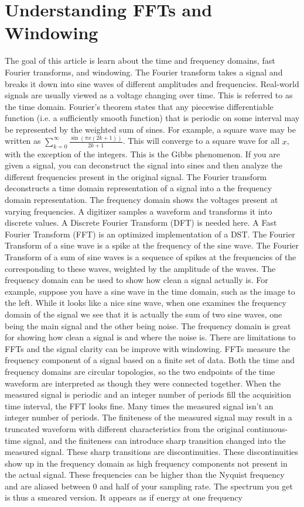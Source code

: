 \documentclass[oneside]{book}
\theoremstyle{mystyle}
\begin{document}
\section{Understanding FFTs and Windowing}
The goal of this article is learn about the time and frequency domains, fast Fourier transforms, and windowing. The Fourier transform takes a signal and breaks it down into sine waves of different amplitudes and frequencies. Real-world signals are usually viewed as a voltage changing over time. This is referred to as the time domain. Fourier's theorem states that any piecewise differentiable function (i.e. a sufficiently smooth function) that is periodic on some interval may be represented by the weighted sum of sines. For example, a square wave may be written as $\sum_{k=0}^{\infty}\frac{\sin(\pi x(2k+1))}{2k+1}$. This will converge to a square wave for all $x$, with the exception of the integers. This is the Gibbs phenomenon. If you are given a signal, you can deconstruct the signal into sines and then analyze the different frequencies present in the original signal. The Fourier transform deconstructs a time domain representation of a signal into a the frequency domain representation. The frequency domain shows the voltages present at varying frequencies. A digitizer samples a waveform and transforms it into discrete values. A Discrete Fourier Transform (DFT) is needed here. A Fast Fourier Transform (FFT) is an optimized implementation of a DST. The Fourier Transform of a sine wave is a spike at the frequency of the sine wave. The Fourier Transform of a sum of sine waves is a sequence of spikes at the frequencies of the corresponding to these waves, weighted by the amplitude of the waves. The frequency domain can be used to show how clean a signal actually is. For example, suppose you have a sine wave in the time domain, such as the image to the left. While it looks like a nice sine wave, when one examines the frequency domain of the signal we see that it is actually the sum of two sine waves, one being the main signal and the other being noise. The frequency domain is great for showing how clean a signal is and where the noise is. There are limitations to FFTs and the signal clarity can be improve with windowing. FFTs measure the frequency component of a signal based on a finite set of data. Both the time and frequency domains are circular topologies, so the two endpoints of the time waveform are interpreted as though they were connected together. When the measured signal is periodic and an integer number of periods fill the acquisition time interval, the FFT looks fine. Many times the measured signal isn't an integer number of periods. The finiteness of the measured signal may result in a truncated waveform with different characteristics from the original continuous-time signal, and the finiteness can introduce sharp transition changed into the measured signal. These sharp transitions are discontinuities. These discontinuities show up in the frequency domain as high frequency components not present in the actual signal. These frequencies can be higher than the Nyquist frequency and are aliased between $0$ and half of your sampling rate. The spectrum you get is thus a smeared version. It appears as if energy at one frequency 
\end{document}

